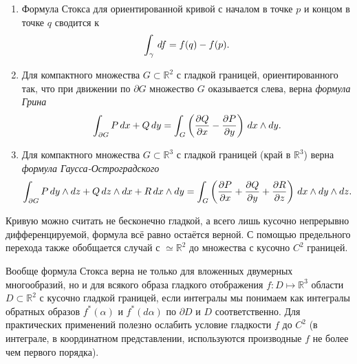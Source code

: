 \begin{enumerate}[label={$\mathbb{R}^\text{\arabic*}$.}]
    \item Формула Стокса для ориентированной кривой с началом в точке $p$ и концом в точке $q$ сводится к 
    \begin{equation*}
        \int_\gamma \, d f = f(q) - f(p).
    \end{equation*}
    \item Для компактного множества $G \subset \mathbb{R}^2$ с гладкой границей, ориентированного так, что при движении по $\partial G$ множество $G$ оказывается слева, верна \textit{формула Грина}
    \begin{equation*}
        \int_{\partial G} P \, d x + Q \, d y = \int_G
        \left(
            \frac{\partial Q}{\partial x} - \frac{\partial P}{\partial y} 
        \right) \, d x \wedge d y.
    \end{equation*}
    \item Для компактного множества $G \subset \mathbb{R}^3$ с гладкой границей (край в $\mathbb{R}^3$) верна \textit{формула Гаусса-Остроградского}
    \begin{equation*}
        \int_{\partial G} P \, d y \wedge d z 
        + Q \, d z \wedge dx 
        + R \, d x \wedge dy = 
        \int_G
        \left(
            \frac{\partial P}{\partial x} +
            \frac{\partial Q}{\partial y} +
            \frac{\partial R}{\partial z} 
        \right) \, d x \wedge d y \wedge d z.
    \end{equation*}
\end{enumerate}


Кривую можно считать не бесконечно гладкой, а всего лишь кусочно непрерывно дифференцируемой, формула всё равно остаётся верной. С помощью предельного перехода также обобщается случай с $\simeq \mathbb{R}^2$ до множества с кусочно $C^2$ границей.

Вообще формула Стокса верна не только для вложенных двумерных многообразий, но и для всякого образа гладкого отображения $f \colon D \mapsto  \mathbb{R}^3$ области $D \subset \mathbb{R}^2$ с кусочно гладкой границей, если интегралы мы понимаем как интегралы обратных образов $f^*(\alpha)$ и $f^*(d\alpha)$ по $\partial D$ и $D$ соответственно. Для практических применений полезно ослабить условие гладкости $f$ до $C^2$ (в интеграле, в координатном представлении, используются производные $f$ не более чем первого порядка).



